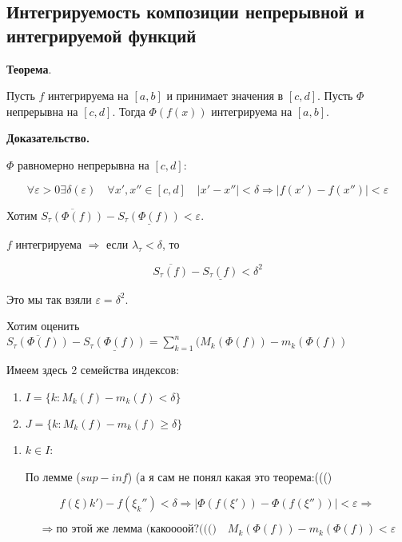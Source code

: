 \documentclass[a4paper]{article}
\begin{document}
\begin{definit}
\hypertarget{p10}{}
\subsection*{Интегрируемость композиции непрерывной и интегрируемой функций}

\begin{htheorem}\textbf{Теорема}.

Пусть $f$ интегрируема на $[a,b]$ и принимает значения в $[c,d]$. Пусть $\Phi$ непрерывна на $[c,d]$. Тогда $\Phi(f(x))$ интегрируема на $[a,b]$.
\end{htheorem}

\begin{hproof}\textbf{Доказательство.}

$\Phi$ равномерно непрерывна на $[c,d]$:

\[
\forall \varepsilon > 0 \exists \delta(\varepsilon) \quad \forall x', x'' \in [c,d] \quad |x'-x''| < \delta \Rightarrow |f(x')-f(x'')|<\varepsilon
\]

Хотим $\overline{S_\tau(\Phi(f))} - \underline{S_\tau(\Phi(f))} < \varepsilon$.

$f$ интегрируема $\Rightarrow$ если $\lambda_\tau < \delta$, то 

\[
\overline{S_\tau(f)} - \underline{S_\tau(f)} < \delta^2
\]

Это мы так взяли $\varepsilon = \delta^2$.

Хотим оценить $\overline{S_\tau(\Phi(f))} - \underline{S_\tau(\Phi(f))} = \sum_{k=1}^n (M_k(\Phi(f)) - m_k(\Phi(f))$

Имеем здесь 2 семейства индексов:

\begin{enumerate}
\item $I = \{k: M_k(f) - m_k(f) < \delta \}$
\item $J = \{k: M_k(f) - m_k(f) \geq \delta \}$
\end{enumerate}


\begin{enumerate}
\item $k \in I$:

По лемме ($sup - inf$) (а я сам не понял какая это теорема:((()

\[
f(\xi)k') - f(\xi_k'') < \delta \Rightarrow | \Phi(f(\xi')) - \Phi(f(\xi''))| < \varepsilon \Rightarrow
\]

\[
\Rightarrow \text{по этой же лемма (какоооой?((()} \quad M_k(\Phi(f)) - m_k(\Phi(f)) < \varepsilon
\]


\end{enumerate}
\end{hproof}
\end{definit}
\end{document}
